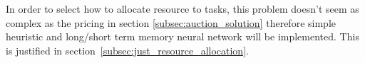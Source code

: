 \documentclass[sotoncolour]{extra/uosproject}     %
\begin{document}
In order to select how to allocate resource to tasks, this problem doesn't seem as complex as the pricing in section \ref{subsec:auction_solution} therefore simple heuristic and long/short term memory neural network will be implemented. This is justified in section~\ref{subsec:just_resource_allocation}.

%        
%        
%        
%        
\end{document}
